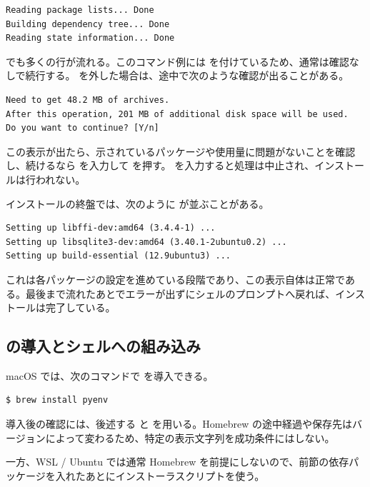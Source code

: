 \begin{lstlisting}[numbers=none, xleftmargin=2\zw]
Reading package lists... Done
Building dependency tree... Done
Reading state information... Done
\end{lstlisting}

 でも多くの行が流れる。このコマンド例には  を付けているため、通常は確認なしで続行する。 を外した場合は、途中で次のような確認が出ることがある。

\begin{lstlisting}[numbers=none, xleftmargin=2\zw]
Need to get 48.2 MB of archives.
After this operation, 201 MB of additional disk space will be used.
Do you want to continue? [Y/n]
\end{lstlisting}

この表示が出たら、示されているパッケージや使用量に問題がないことを確認し、続けるなら  を入力して  を押す。 を入力すると処理は中止され、インストールは行われない。

インストールの終盤では、次のように  が並ぶことがある。

\begin{lstlisting}[numbers=none, xleftmargin=2\zw]
Setting up libffi-dev:amd64 (3.4.4-1) ...
Setting up libsqlite3-dev:amd64 (3.40.1-2ubuntu0.2) ...
Setting up build-essential (12.9ubuntu3) ...
\end{lstlisting}

これは各パッケージの設定を進めている段階であり、この表示自体は正常である。最後まで流れたあとでエラーが出ずにシェルのプロンプトへ戻れば、インストールは完了している。

\subsection{ の導入とシェルへの組み込み}

macOS では、次のコマンドで  を導入できる。

\begin{lstlisting}[numbers=none, xleftmargin=2\zw]
$ brew install pyenv
\end{lstlisting}

導入後の確認には、後述する  と  を用いる。Homebrew の途中経過や保存先はバージョンによって変わるため、特定の表示文字列を成功条件にはしない。

一方、WSL / Ubuntu では通常 Homebrew を前提にしないので、前節の依存パッケージを入れたあとにインストーラスクリプトを使う。

